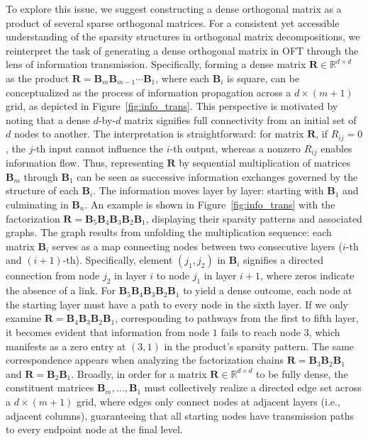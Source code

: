 To explore this issue, we suggest constructing a dense orthogonal matrix as a product of several sparse orthogonal matrices. For a consistent yet accessible understanding of the sparsity structures in orthogonal matrix decompositions, we reinterpret the task of generating a dense orthogonal matrix in OFT through the lens of information transmission. Specifically, forming a dense matrix $\bm{R}\in\mathbb{R}^{d\times d}$ as the product $\bm{R}=\bm{B}_m\bm{B}_{m-1}\cdots\bm{B}_1$, where each $\bm{B}_i$ is square, can be conceptualized as the process of information propagation across a $d\times (m+1)$ grid, as depicted in Figure~\ref{fig:info_trans}. This perspective is motivated by noting that a dense $d$-by-$d$ matrix signifies full connectivity from an initial set of $d$ nodes to another. The interpretation is straightforward: for matrix $\bm{R}$, if $R_{ij}=0$, the $j$-th input cannot influence the $i$-th output, whereas a nonzero $R_{ij}$ enables information flow. Thus, representing $\bm{R}$ by sequential multiplication of matrices $\bm{B}_m$ through $\bm{B}_1$ can be seen as successive information exchanges governed by the structure of each $\bm{B}_i$. The information moves layer by layer: starting with $\bm{B}_1$ and culminating in $\bm{B}_n$. An example is shown in Figure~\ref{fig:info_trans} with the factorization $\bm{R}=\bm{B}_5\bm{B}_4\bm{B}_3\bm{B}_2\bm{B}_1$, displaying their sparsity patterns and associated graphs. The graph results from unfolding the multiplication sequence: each matrix $\bm{B}_i$ serves as a map connecting nodes between two consecutive layers ($i$-th and $(i+1)$-th). Specifically, element $(j_1,j_2)$ in $\bm{B}_i$ signifies a directed connection from node $j_2$ in layer $i$ to node $j_1$ in layer $i+1$, where zeros indicate the absence of a link. For $\bm{B}_5\bm{B}_4\bm{B}_3\bm{B}_2\bm{B}_1$ to yield a dense outcome, each node at the starting layer must have a path to every node in the sixth layer. If we only examine $\bm{R}=\bm{B}_4\bm{B}_3\bm{B}_2\bm{B}_1$, corresponding to pathways from the first to fifth layer, it becomes evident that information from node $1$ fails to reach node $3$, which manifests as a zero entry at $(3,1)$ in the product’s sparsity pattern. The same correspondence appears when analyzing the factorization chains $\bm{R}=\bm{B}_3\bm{B}_2\bm{B}_1$ and $\bm{R}=\bm{B}_2\bm{B}_1$. Broadly, in order for a matrix $\bm{R}\in\mathbb{R}^{d\times d}$ to be fully dense, the constituent matrices $\bm{B}_m,\ldots,\bm{B}_1$ must collectively realize a directed edge set across a $d\times(m+1)$ grid, where edges only connect nodes at adjacent layers (i.e., adjacent columns), guaranteeing that all starting nodes have transmission paths to every endpoint node at the final level.

